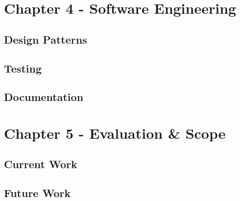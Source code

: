 \documentclass{article}
\begin{document}

\section{Chapter 4 - Software Engineering}

\subsection{Design Patterns}

\subsection{Testing}

\subsection{Documentation}


\section{Chapter 5 - Evaluation \& Scope}

\subsection{Current Work}

\subsection{Future Work}

\end{document}
